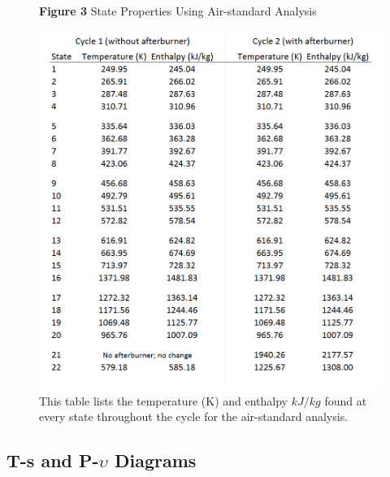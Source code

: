 \documentclass[11pt]{article} %
\begin{document}
\begin{figure}[!hp]
  \centering
  \textbf{Figure 3} State Properties Using Air-standard Analysis\par\medskip
  \includegraphics[scale=0.832]{regular_air_data.png}
  \caption{This table lists the temperature (K) and enthalpy $\si{kJ/kg}$ found at every state throughout the cycle for the air-standard analysis.}
  \label{fig:regular_air_data}
\end{figure}

\pagebreak
\subsection*{T-s and P-$\upsilon$ Diagrams}
\end{document}
